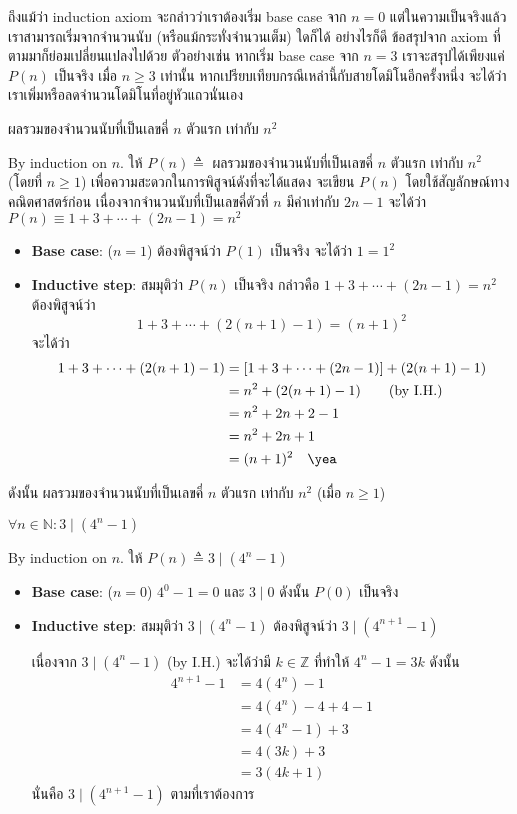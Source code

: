 ถึงแม้ว่า induction axiom จะกล่าวว่าเราต้องเริ่ม base case จาก $n=0$ แต่ในความเป็นจริงแล้ว เราสามารถเริ่มจากจำนวนนับ (หรือแม้กระทั่งจำนวนเต็ม) ใดก็ได้ อย่างไรก็ดี ข้อสรุปจาก axiom ที่ตามมาก็ย่อมเปลี่ยนแปลงไปด้วย ตัวอย่างเช่น หากเริ่ม base case จาก $n=3$ เราจะสรุปได้เพียงแค่ $P(n)$ เป็นจริง เมื่อ $n\geq 3$ เท่านั้น หากเปรียบเทียบกรณีเหล่านี้กับสายโดมิโนอีกครั้งหนึ่ง จะได้ว่าเราเพิ่มหรือลดจำนวนโดมิโนที่อยู่หัวแถวนั่นเอง

\begin{theorem}
ผลรวมของจำนวนนับที่เป็นเลขคี่ $n$ ตัวแรก เท่ากับ $n^2$
\begin{pf}
By induction on $n$.  ให้ $P(n)\triangleq$ ผลรวมของจำนวนนับที่เป็นเลขคี่ $n$ ตัวแรก เท่ากับ $n^2$ (โดยที่ $n\geq 1$) \enskip เพื่อความสะดวกในการพิสูจน์ดังที่จะได้แสดง จะเขียน $P(n)$ โดยใช้สัญลักษณ์ทางคณิตศาสตร์ก่อน เนื่องจากจำนวนนับที่เป็นเลขคี่ตัวที่ $n$ มีค่าเท่ากับ $2n-1$ จะได้ว่า $P(n)\equiv 1+3+\cdots+(2n-1)=n^2$
\begin{itemize}
\item {\bf Base case}: ($n=1$) \quad ต้องพิสูจน์ว่า $P(1)$ เป็นจริง จะได้ว่า $1=1^2$ \quad\yea
\item {\bf Inductive step}: สมมุติว่า $P(n)$ เป็นจริง กล่าวคือ $1+3+\cdots+(2n-1)=n^2$ ต้องพิสูจน์ว่า \[1+3+\cdots+(2(n+1)-1)=(n+1)^2\] จะได้ว่า
\begin{align*}
1+3+\cdots+(2(n+1)-1)
&=\left[1+3+\cdots+(2n-1)\right]+(2(n+1)-1) \\
&=n^2+(2(n+1)-1) \qquad\textup{(by I.H.)} \\
&=n^2+2n+2-1 \\
&=n^2+2n+1 \\
&=(n+1)^2 \quad\textup{\yea}
\end{align*}
\end{itemize}
ดังนั้น ผลรวมของจำนวนนับที่เป็นเลขคี่ $n$ ตัวแรก เท่ากับ $n^2$ (เมื่อ $n\geq 1$)
\end{pf}
\end{theorem}

\begin{theorem}
$\forall n\in\mathbb{N}: 3\mid (4^n-1)$
\begin{pf}
By induction on $n$.  ให้ $P(n)\triangleq 3\mid(4^n-1)$
\begin{itemize}
\item {\bf Base case}: ($n=0$) \quad $4^0-1=0$ และ $3\mid 0$ ดังนั้น $P(0)$ เป็นจริง \quad\yea
\item {\bf Inductive step}: สมมุติว่า $3\mid (4^n-1)$ ต้องพิสูจน์ว่า $3\mid(4^{n+1}-1)$

เนื่องจาก $3\mid(4^n-1)$ (by I.H.) จะได้ว่ามี $k\in\mathbb{Z}$ ที่ทำให้ $4^n-1=3k$ \enskip ดังนั้น
\begin{align*}
4^{n+1}-1
&= 4(4^n)-1 \\
&= 4(4^n)-4+4-1 \\
&= 4(4^n-1)+3 \\
&= 4(3k)+3 \\
&= 3(4k+1)
\end{align*}
นั่นคือ $3\mid (4^{n+1}-1)$ ตามที่เราต้องการ \quad\yea
\end{itemize}
\end{pf}
\end{theorem}

